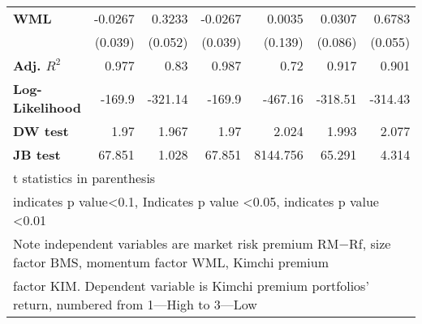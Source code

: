 \documentclass{article}
\begin{document}
\begin{sidewaystable}[htbp]
\begin{tabular}{lllllll}
    \textbf{WML} & \multicolumn{1}{r}{-0.0267} & \multicolumn{1}{r}{0.3233} & \multicolumn{1}{r}{-0.0267} & \multicolumn{1}{r}{0.0035} & \multicolumn{1}{r}{0.0307} & \multicolumn{1}{r}{0.6783} \\
          & \multicolumn{1}{r}{(0.039)} & \multicolumn{1}{r}{(0.052)} & \multicolumn{1}{r}{(0.039)} & \multicolumn{1}{r}{(0.139)} & \multicolumn{1}{r}{(0.086)} & \multicolumn{1}{r}{(0.055)} \\
    \textbf{Adj. \boldmath$R^2$} & \multicolumn{1}{r}{0.977} & \multicolumn{1}{r}{0.83} & \multicolumn{1}{r}{0.987} & \multicolumn{1}{r}{0.72} & \multicolumn{1}{r}{0.917} & \multicolumn{1}{r}{0.901} \\
    \textbf{Log-Likelihood} & \multicolumn{1}{r}{-169.9} & \multicolumn{1}{r}{-321.14} & \multicolumn{1}{r}{-169.9} & \multicolumn{1}{r}{-467.16} & \multicolumn{1}{r}{-318.51} & \multicolumn{1}{r}{-314.43} \\
    \textbf{DW test} & \multicolumn{1}{r}{1.97} & \multicolumn{1}{r}{1.967} & \multicolumn{1}{r}{1.97} & \multicolumn{1}{r}{2.024} & \multicolumn{1}{r}{1.993} & \multicolumn{1}{r}{2.077} \\
    \textbf{JB test} & \multicolumn{1}{r}{67.851} & \multicolumn{1}{r}{1.028} & \multicolumn{1}{r}{67.851} & \multicolumn{1}{r}{8144.756} & \multicolumn{1}{r}{65.291} & \multicolumn{1}{r}{4.314} \\
    \midrule
    \multicolumn{7}{l}{t statistics in parenthesis} \\
    \multicolumn{7}{l}{\hspace{0.2cm}indicates p value\textless0.1, \hspace{0.3cm} Indicates p value \textless 0.05, \hspace{0.4cm}   indicates p value \textless 0.01} \\
    \multicolumn{7}{l}{Note independent variables are market risk premium RM−Rf, size factor BMS, momentum factor WML, Kimchi premium} \\
    \multicolumn{7}{l}{factor KIM. Dependent variable is Kimchi premium portfolios' return, numbered from 1—High to 3—Low} \\
    \end{tabular}%
  \label{tab:addlabel}%
\end{sidewaystable}%
\end{document}
